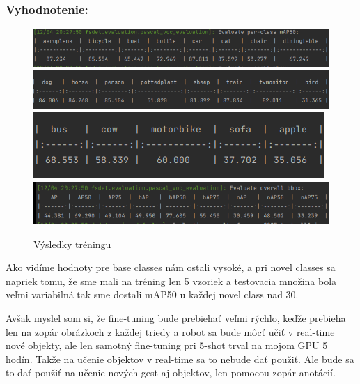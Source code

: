 \subsubsection{Vyhodnotenie:}

\begin{figure}[!hbt]
\includegraphics[width=\textwidth]{images/eval1.png}
\includegraphics[width=\textwidth]{images/eval2.png}
\includegraphics[width=\textwidth]{images/eval3.png}
\includegraphics[width=\textwidth]{images/eval4.png}
\caption{Výsledky tréningu}
\label{fig:image}
\end{figure}


Ako vidíme hodnoty pre base classes nám ostali vysoké, a pri novel classes sa napriek tomu, že sme mali na tréning len 5 vzoriek a testovacia množina bola veľmi variabilná tak sme dostali mAP50 u každej novel class nad 30. 

Avšak myslel som si, že fine-tuning bude prebiehať veľmi rýchlo, keďže prebieha len na zopár obrázkoch z každej triedy a robot sa bude môcť učiť v real-time nové objekty, ale len samotný fine-tuning pri 5-shot trval na mojom GPU 5 hodín. Takže na učenie objektov v real-time sa to nebude dať použiť. Ale bude sa to dať použiť na učenie nových gest aj objektov, len pomocou zopár anotácií. 